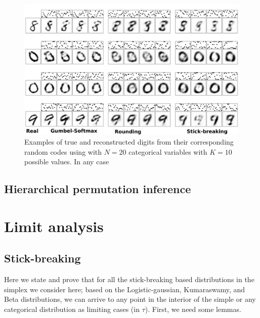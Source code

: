 \documentclass{article}
\begin{document}
\label{sub:synthetic}


\begin{figure}[t]
  \centering
  \includegraphics[width=5.in]{../figures/figure4.pdf} 
  \caption{Examples of true and reconstructed digits from their corresponding random codes using with $N=20$ categorical variables with $K=10$ possible values. In any case 
  }
\label{fig:synthetic}
\end{figure}

\label{sub:vae}

\subsection{Hierarchical permutation inference}
\label{sub:synth_celegans}






\appendix
\section{Limit analysis}
\subsection{Stick-breaking}
Here we state and prove that for all the stick-breaking based distributions in the simplex we consider here; based on the Logistic-gaussian, Kumaraswamy, and Beta distributions, we can arrive to any point in the interior of the simple or any categorical distribution as limiting cases (in $\tau$). First, we need some lemmas.
\end{document}
